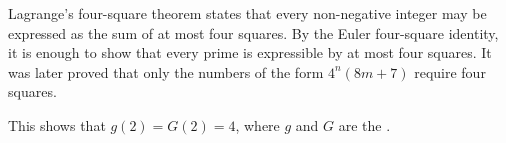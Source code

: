 \documentclass[12pt]{article}
\begin{document}

Lagrange's four-square theorem states that every non-negative integer may be expressed as the sum of at most four squares. By the Euler four-square identity, it is enough to show that every prime is expressible by at most four squares. It was later proved that only the numbers of the form $4^n(8m + 7)$ require four squares.

This shows that $g(2) = G(2) = 4$, where $g$ and $G$ are the .
\end{document}
